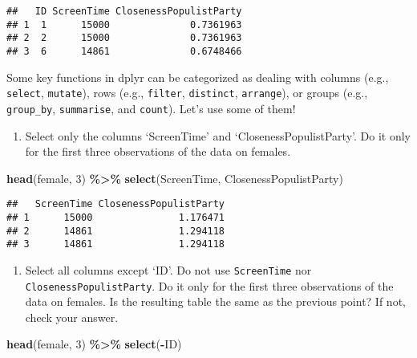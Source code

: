 \documentclass[
]{book}
\newenvironment{Shaded}{\begin{snugshade}}{\end{snugshade}}
\newcommand{\DecValTok}[1]{\textcolor[rgb]{0.00,0.00,0.81}{#1}}
\newcommand{\FunctionTok}[1]{\textcolor[rgb]{0.13,0.29,0.53}{\textbf{#1}}}
\newcommand{\NormalTok}[1]{#1}
\newcommand{\SpecialCharTok}[1]{\textcolor[rgb]{0.81,0.36,0.00}{\textbf{#1}}}
\providecommand{\tightlist}{%
  \setlength{\itemsep}{0pt}\setlength{\parskip}{0pt}}
\begin{document}
\begin{verbatim}
##   ID ScreenTime ClosenessPopulistParty
## 1  1      15000              0.7361963
## 2  2      15000              0.7361963
## 3  6      14861              0.6748466
\end{verbatim}

Some key functions in dplyr can be categorized as dealing with columns (e.g., \texttt{select}, \texttt{mutate}), rows (e.g., \texttt{filter}, \texttt{distinct}, \texttt{arrange}), or groups (e.g., \texttt{group\_by}, \texttt{summarise}, and \texttt{count}). Let's use some of them!

\begin{enumerate}
\def\labelenumi{\arabic{enumi}.}
\setcounter{enumi}{1}
\tightlist
\item
  Select only the columns `ScreenTime' and `ClosenessPopulistParty'. Do it only for the first three observations of the data on females.
\end{enumerate}

\begin{Shaded}
\begin{Highlighting}[]
\FunctionTok{head}\NormalTok{(female, }\DecValTok{3}\NormalTok{) }\SpecialCharTok{\%\textgreater{}\%}
  \FunctionTok{select}\NormalTok{(ScreenTime, ClosenessPopulistParty)}
\end{Highlighting}
\end{Shaded}

\begin{verbatim}
##   ScreenTime ClosenessPopulistParty
## 1      15000               1.176471
## 2      14861               1.294118
## 3      14861               1.294118
\end{verbatim}

\begin{enumerate}
\def\labelenumi{\arabic{enumi}.}
\setcounter{enumi}{2}
\tightlist
\item
  Select all columns except `ID'. Do not use \texttt{ScreenTime} nor \texttt{ClosenessPopulistParty}. Do it only for the first three observations of the data on females. Is the resulting table the same as the previous point? If not, check your answer.
\end{enumerate}

\begin{Shaded}
\begin{Highlighting}[]
\FunctionTok{head}\NormalTok{(female, }\DecValTok{3}\NormalTok{) }\SpecialCharTok{\%\textgreater{}\%}
  \FunctionTok{select}\NormalTok{(}\SpecialCharTok{{-}}\NormalTok{ID)}
\end{Highlighting}
\end{Shaded}
\end{document}
